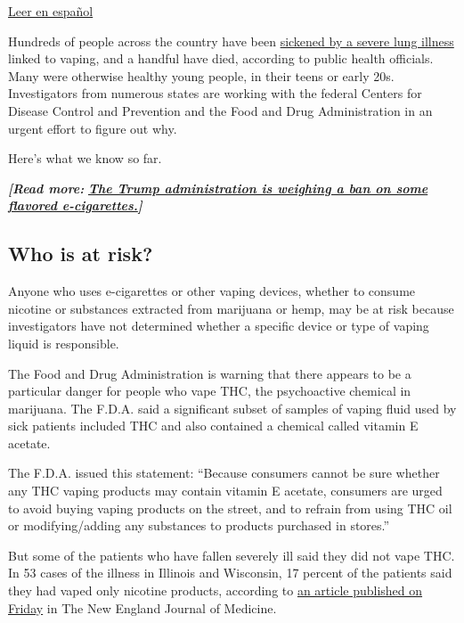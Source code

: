 \href{https://www.nytimes3xbfgragh.onion/es/2019/09/10/espanol/ciencia-y-tecnologia/vapeo-riesgos-salud.html}{Leer
en español}

Hundreds of people across the country have been
\href{https://www.nytimes3xbfgragh.onion/2019/09/06/health/third-death-vaping-related-disease.html?action=click\&module=Well\&pgtype=Homepage\&section=Health}{sickened
by a severe lung illness} linked to vaping, and a handful have died,
according to public health officials. Many were otherwise healthy young
people, in their teens or early 20s. Investigators from numerous states
are working with the federal Centers for Disease Control and Prevention
and the Food and Drug Administration in an urgent effort to figure out
why.

Here's what we know so far.

\emph{\textbf{{[}Read more:}}
\textbf{\href{https://www.nytimes3xbfgragh.onion/2019/09/11/health/trump-vaping-flavored-ecigarettes.html}{\emph{The
Trump administration is weighing a ban on some flavored
e-cigarettes.}}\emph{{]}}}

\hypertarget{who-is-at-risk}{%
\subsection{Who is at risk?}\label{who-is-at-risk}}

Anyone who uses e-cigarettes or other vaping devices, whether to consume
nicotine or substances extracted from marijuana or hemp, may be at risk
because investigators have not determined whether a specific device or
type of vaping liquid is responsible.

The Food and Drug Administration is warning that there appears to be a
particular danger for people who vape THC, the psychoactive chemical in
marijuana. The F.D.A. said a significant subset of samples of vaping
fluid used by sick patients included THC and also contained a chemical
called vitamin E acetate.

The F.D.A. issued this statement: ``Because consumers cannot be sure
whether any THC vaping products may contain vitamin E acetate, consumers
are urged to avoid buying vaping products on the street, and to refrain
from using THC oil or modifying/adding any substances to products
purchased in stores.''

But some of the patients who have fallen severely ill said they did not
vape THC. In 53 cases of the illness in Illinois and Wisconsin, 17
percent of the patients said they had vaped only nicotine products,
according to
\href{https://www.nejm.org/doi/full/10.1056/NEJMoa1911614}{an article
published on Friday} in The New England Journal of Medicine.

